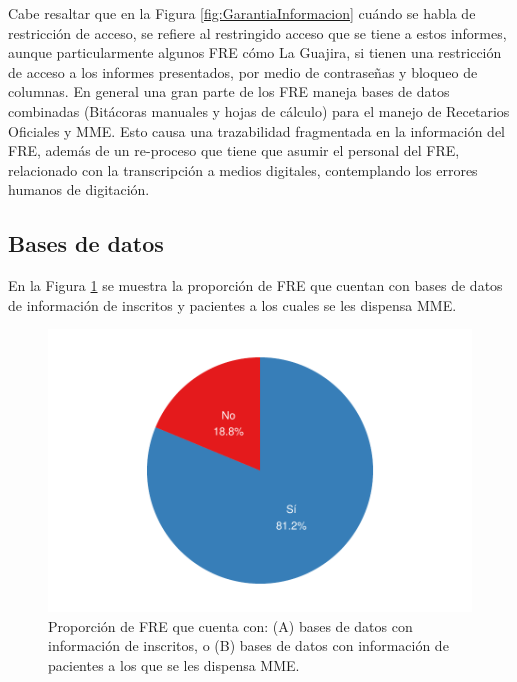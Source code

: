 \documentclass[
]{book}
\begin{document}
Cabe resaltar que en la Figura \ref{fig:GarantiaInformacion} cuándo se habla de restricción de acceso, se refiere al restringido acceso que se tiene a estos informes, aunque particularmente algunos FRE cómo La Guajira, si tienen una restricción de acceso a los informes presentados, por medio de contraseñas y bloqueo de columnas. En general una gran parte de los FRE maneja bases de datos combinadas (Bitácoras manuales y hojas de cálculo) para el manejo de Recetarios Oficiales y MME. Esto causa una trazabilidad fragmentada en la información del FRE, además de un re-proceso que tiene que asumir el personal del FRE, relacionado con la transcripción a medios digitales, contemplando los errores humanos de digitación.

\hypertarget{bases-de-datos}{%
\subsection{Bases de datos}\label{bases-de-datos}}

En la Figura \ref{fig:InformInscritos} se muestra la proporción de FRE que cuentan con bases de datos de información de inscritos y pacientes a los cuales se les dispensa MME.

\begin{figure}

{\centering \includegraphics[width=1\linewidth]{InformeFinal_files/figure-latex/InformInscritos-1} 

}

\caption{Proporción de FRE que cuenta con: (A) bases de datos con información de inscritos, o (B) bases de datos con información de pacientes a los que se les dispensa MME.}\label{fig:InformInscritos}
\end{figure}
\end{document}
